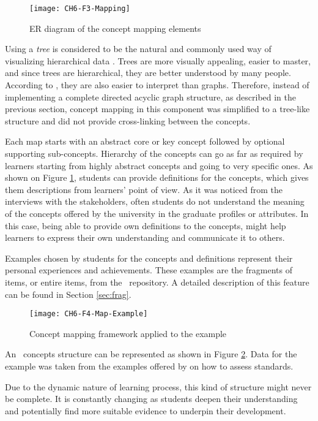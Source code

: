 \begin{figure}[htb]
\centering
\texttt{[image: CH6-F3-Mapping]}
\caption{ER diagram of the concept mapping elements}
\label{fig:mapping}
\end{figure}

Using a \textit{tree} is considered to be the natural and commonly used way of
visualizing hierarchical data \citep{Gorg2007,Holten2006}. Trees are more
visually appealing, easier to master, and since trees are hierarchical, they are
better understood by many people. According to \citet{LeGrand2006}, they are
also easier to interpret than graphs. Therefore, instead of implementing a
complete directed acyclic graph structure, as described in the previous section,
concept mapping in this component was simplified to a tree-like structure and
did not provide cross-linking between the concepts.

Each map starts with an abstract core or key concept followed by optional
supporting sub-concepts. Hierarchy of the concepts can go as far as required by
learners starting from highly abstract concepts and going to very specific ones.
As shown on Figure \ref{fig:mapping}, students can provide definitions for the
concepts, which gives them descriptions from learners' point of view. As it was
noticed from the interviews with the stakeholders, often students do not
understand the meaning of the concepts offered by the university in the graduate
profiles or attributes. In this case, being able to provide own definitions to
the concepts, might help learners to express their own understanding and
communicate it to others.

Examples chosen by students for the concepts and definitions represent their
personal experiences and achievements. These examples are the fragments of
items, or entire items, from the \ep~repository. A detailed description of this
feature can be found in Section \ref{sec:frag}.

\begin{figure}[htb]
\centering
\texttt{[image: CH6-F4-Map-Example]}
\caption{Concept mapping framework applied to the example}
\label{fig:mapex} 
\end{figure}

An \ep~concepts structure can be represented as shown in Figure \ref{fig:mapex}.
Data for the example was taken from the examples offered by \citet{Marzano1993}
on how to assess \LLLs standards.

Due to the dynamic nature of learning process, this kind of structure might
never be complete. It is constantly changing as students deepen their
understanding and potentially find more suitable evidence to underpin their
development.

